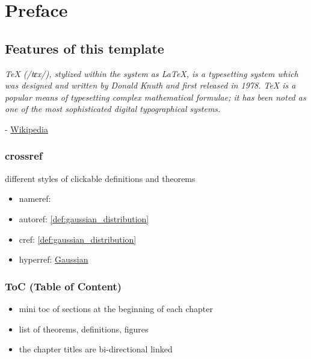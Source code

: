 \chapter*{Preface}
\minitoc


\section{Features of this template}
\epigraph{\emph{TeX (/tɛx/), stylized within the system as \LaTeX, is a typesetting system which was designed and written by Donald Knuth and first released in 1978. TeX is a popular means of typesetting complex mathematical formulae; it has been noted as one of the most sophisticated digital typographical systems.}}{- \href{https://en.wikipedia.org/wiki/TeX}{Wikipedia}}

\subsection{crossref}
different styles of clickable definitions and theorems
\begin{itemize}
	\item nameref:

	\item autoref:
		\autoref{def:gaussian_distribution}

	\item cref:
		\cref{def:gaussian_distribution}

	\item hyperref:
		\hyperref[def:gaussian_distribution]{Gaussian}
\end{itemize}

\subsection{ToC (Table of Content)}
\begin{itemize}
	\item mini toc of sections at the beginning of each chapter
	\item list of theorems, definitions, figures
	\item the chapter titles are bi-directional linked
\end{itemize}


